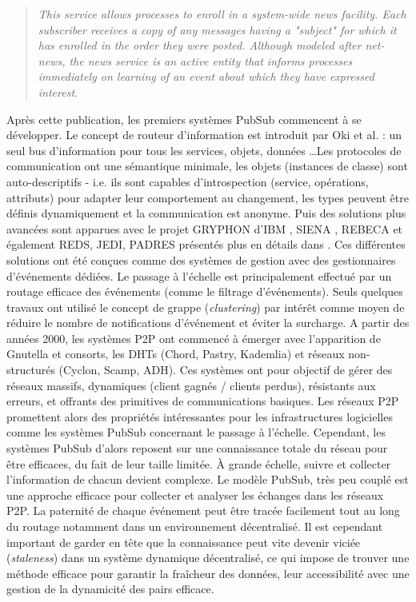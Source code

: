 \blockcquote{Birman1987}{
	\og\textit{ This service allows processes to enroll in a 
		system-wide news facility. Each subscriber receives a
		copy of any messages having a "subject" for which it 
		has enrolled in the order they were posted. Although 
		modeled after net-news, the news service is an active 
		entity that informs processes immediately on learning 
		of an event about which they have expressed interest.}\fg{}
}

Après cette publication, les premiers systèmes \gls{PubSub} commencent à 
se développer. Le concept de routeur d'information est introduit par Oki et al. 
\cite{Oki1993} : un seul bus d'information pour tous les services, objets, données
\dots Les protocoles de communication ont une sémantique minimale, 
les objets (instances de classe) sont auto-descriptifs - i.e. ils sont 
capables d'introspection (service, opérations, attributs) pour adapter leur 
comportement au changement, les types peuvent être définis dynamiquement et 
la communication est anonyme. 
Puis des solutions plus avancées sont apparues avec le projet 
GRYPHON d'IBM \cite{Banavar1999}, SIENA \cite{Carzaniga2000}, REBECA 
\cite{Parzyjegla2010} et également REDS, JEDI, PADRES présentés plus en 
détails dans \cite{Tarkoma2012}.
Ces différentes solutions ont été conçues comme des systèmes de gestion avec 
des gestionnaires d'événements dédiées. Le passage à l'échelle est 
principalement effectué par un routage efficace des événements (comme le 
filtrage d'événements). Seuls quelques travaux ont utilisé le concept de grappe 
(\textit{clustering}) par intérêt comme moyen de réduire le nombre de 
notifications d'événement et éviter la surcharge. 
A partir des années 2000, les 
systèmes \gls{P2P} ont commencé à émerger avec 
l'apparition de Gnutella\cite{Ripeanu} et consorts, les \glspl{DHT}
(Chord, Pastry, Kademlia) et  réseaux non-structurés (Cyclon, Scamp, ADH). 
Ces systèmes ont pour objectif de gérer des réseaux massifs, dynamiques 
(client gagnés / clients perdus), résistants aux erreurs, et offrants des primitives 
de communications basiques.
Les réseaux \gls{P2P} promettent alors des propriétés intéressantes pour les 
infrastructures logicielles comme les systèmes \gls{PubSub} concernant le passage à 
l'échelle. Cependant, les systèmes \gls{PubSub} d'alors reposent sur une connaissance 
totale du réseau pour être efficaces, du fait de leur taille limitée. À grande échelle, 
suivre et collecter l'information de chacun devient complexe. 
Le modèle \gls{PubSub}, très peu couplé est une approche efficace pour collecter et analyser 
les échanges dans les réseaux \gls{P2P}. La paternité de chaque événement peut être 
tracée facilement tout au long du routage notamment dans un environnement décentralisé.
Il est cependant important de garder en tête que la connaissance peut vite devenir 
viciée (\textit{staleness}) dans un système dynamique décentralisé, ce qui impose de trouver une méthode 
efficace pour garantir la fraîcheur des données, leur accessibilité avec une gestion 
de la dynamicité des pairs efficace.

